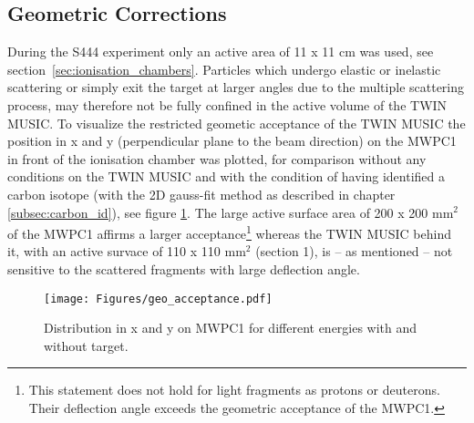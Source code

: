 \subsection{Geometric Corrections}\label{sec:geo_corr}
During the S444 experiment only an active area of 11 x 11 cm was used, see section~\ref{sec:ionisation_chambers}. Particles which undergo elastic or inelastic scattering or simply exit the target at larger angles due to the multiple scattering process, may therefore not be fully confined in the active volume of the TWIN MUSIC. To visualize the restricted geometic acceptance of the TWIN MUSIC the position in x and y (perpendicular plane to the beam direction) on the MWPC1 in front of the ionisation chamber was plotted, for comparison without any conditions on the TWIN MUSIC and with the condition of having identified a carbon isotope (with the 2D gauss-fit method as described in chapter \ref{subsec:carbon_id}), see figure \ref{fig:mw1_xy}. The large active surface area of 200 x 200 mm$^{2}$ of the MWPC1 affirms a larger acceptance\footnote{This statement does not hold for light fragments as protons or deuterons. Their deflection angle exceeds the geometric acceptance of the MWPC1.} whereas the TWIN MUSIC behind it, with an active survace of 110 x 110 mm$^{2}$ (section 1), is -- as mentioned -- not sensitive to the scattered fragments with large deflection angle.\newline
\begin{figure}[htpb]
    \centering
    \texttt{[image: Figures/geo\_acceptance.pdf]}
    \caption{
    Distribution in x and y on MWPC1 for different energies with and without target. 
     }
    \label{fig:mw1_xy}
\end{figure}

